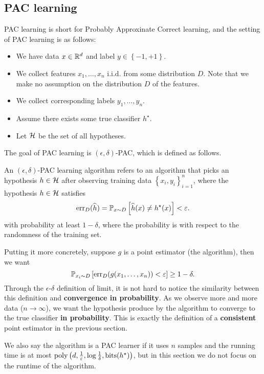 \documentclass[a4paper]{article}
\begin{document}
\subsection{PAC learning}

PAC learning is short for Probably Approxinate Correct
learning, and the setting of PAC learning is as follows:
\begin{itemize}
  \item We have data $x \in \mathbb{R}^d$ and label $y \in \left\{ -1,
  +1 \right\}$.
  \item We collect features $x_1, \dots, x_n$ i.i.d. from
  some distribution $D$. Note that we make no assumption on
  the distribution $D$ of the features.
  \item We collect corresponding labels $y_1, \dots, y_n$.
  \item Assume there exists some true classifier $h^\star$.
  \item Let $\mathcal{H}$ be the set of all hypotheses.
\end{itemize}
The goal of PAC learning is $(\epsilon, \delta)$-PAC,
which is defined as follows.
\begin{defi}
  An $(\epsilon, \delta)$-PAC learning algorithm
  refers to an algorithm that
  picks an hypothesis $h \in \mathcal{H}$
  after observing training data
  $\left\{ x_i, y_i \right\}_{i=1}^n$,
  where the hypothesis $h \in \mathcal{H}$ satisfies
  \[
  \operatorname{err}_D (\widehat{h}) =
  \mathbb{P}_{x \sim D} \left[ \widehat{h}(x) \neq h^\star(x) \right]
  < \varepsilon.
  \]
  with probability at least $1 - \delta$, where the probability
  is with respect to the randomness of the training set.
\end{defi}
Putting it more concretely, suppose $g$ is a point estimator
(the algorithm), then we want
\[
\mathbb{P}_{x_i \sim D} \left[ \operatorname{err}_D (g(x_1, \dots, x_n)) < \varepsilon
\right] \geq 1 - \delta.
\]
Through the $\epsilon$-$\delta$ definition of limit,
it is not hard to
notice the similarity between this definition
and \textbf{convergence in probability}.
As we observe more and more data ($n \to \infty$),
we want the hypothesis
produce by the algorithm to converge to the true classifier
\textbf{in probability}. This is exactly the definition
of a \textbf{consistent} point estimator in the previous
section.

We also say the algorithm is a PAC learner if it uses
$n$ samples and the running time is at most $\operatorname{poly}
\left( d, \frac{1}{\varepsilon}, \log \frac{1}{\delta},
\operatorname{bits}(h^\star) \right)$, but in this section we do not
focus on the runtime of the algorithm.
\end{document}
